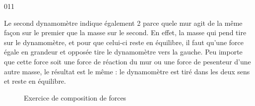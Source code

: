 \documentclass{article}
\begin{document}
\begin{corrige}{011}

Le second dynamomètre indique également \unit{2}{\newton} parce quele mur agit de la même façon sur le premier que la masse sur le second. En effet, la masse qui pend tire sur le dynamomètre, et pour que celui-ci reste en équilibre, il faut qu'une force égale en grandeur et opposée tire le dynamomètre vers la gauche. Peu importe que cette force soit une force de réaction du mur ou une force de pesenteur d'une autre masse, le résultat est le même : le dynamomètre est tiré dans les deux sens et reste en équilibre.
\end{corrige}




\begin{figure}[ht]
\centering


\caption{Exercice de composition de forces}\label{fig:exo:comp:corr}
\end{figure}
\end{document}
